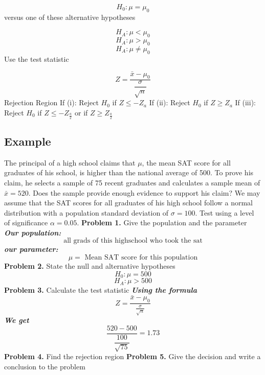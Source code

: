 \documentclass{report}
\begin{document}
$$ H_0 : \mu = \mu_0$$
versus one of these alternative hypotheses

$$ H_A : \mu < \mu_0$$
$$H_A : \mu > \mu_0$$
$$ H_A : \mu \neq \mu_0$$
\bigbreak \noindent
Use the test statistic

$$ Z = \dfrac{\bar{x} - \mu_0}{\dfrac{\sigma}{\sqrt{n}}}$$
\bigbreak \noindent
{}
\bigbreak \noindent
Rejection Region
\bigbreak \noindent
If (i): \hspace{10mm} Reject $H_0$ if $Z \leq - Z_a$
\bigbreak \noindent
If (ii): \hspace{10mm} Reject $H_0$ if $Z \geq Z_a$
\bigbreak \noindent
If (iii): \hspace{10mm} Reject $H_0$ if $Z \leq -Z_{\frac{a}{2}}$ or if $Z \geq Z_{\frac{a}{2}}$

\pagebreak
\subsection*{Example}
The principal of a high school claims that \( \mu \), the mean SAT score for all graduates
of his school, is higher than the national average of 500. To prove his claim, he selects a sample
of 75 recent graduates and calculates a sample mean of \( \bar{x} = 520 \). Does the sample provide
enough evidence to support his claim? We may assume that the SAT scores for all graduates of his high
school follow a normal distribution with a population standard deviation of \( \sigma = 100 \). Test using
a level of significance \( \alpha = 0.05 \).
\bigbreak \noindent
\textbf{Problem 1.} Give the population and the parameter
\bigbreak \noindent
\textit{\textbf{Our population:}}
$$\text{all grads of this highschool who took the sat}$$
\bigbreak \noindent
\textit{\textbf{our parameter:}}
$$ \mu = \text { Mean SAT score for this population}$$
\bigbreak \noindent
\textbf{Problem 2.} State the null and alternative hypotheses
$$ H_0 : \mu = 500$$
$$ H_A : \mu > 500$$
\bigbreak \noindent
\textbf{Problem 3.} Calculate the test statistic
\bigbreak \noindent
\textit{\textbf{Using the formula}}
$$ Z = \dfrac{\bar{x} - \mu_0}{\frac{\sigma}{\sqrt{n}}}$$
\textit{\textbf{We get}}
$$ \dfrac{520 - 500}{\dfrac{100}{\sqrt{75}}} = 1.73$$
\noindent\textbf{Problem 4.} Find the rejection region
\bigbreak \noindent
\textbf{Problem 5.} Give the decision and write a conclusion to the problem
\end{document}

